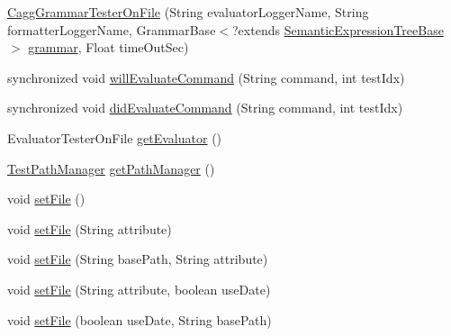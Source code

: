 \begin{DoxyCompactItemize}
\item 
\hyperlink{classit_1_1emarolab_1_1cagg_1_1interfaces_1_1CaggGrammarTesterOnFile_a554c2aac15bab27279c258d28c37d3ad}{Cagg\-Grammar\-Tester\-On\-File} (String evaluator\-Logger\-Name, String formatter\-Logger\-Name, Grammar\-Base$<$?extends \hyperlink{interfaceit_1_1emarolab_1_1cagg_1_1core_1_1evaluation_1_1semanticGrammar_1_1syntaxCompiler_1_1SemanticExpressionTreeBase}{Semantic\-Expression\-Tree\-Base} $>$ \hyperlink{classit_1_1emarolab_1_1cagg_1_1core_1_1evaluation_1_1interfacing_1_1GrammarTesterBase_ac6601808f37ef4327e6308143f01dc6a}{grammar}, Float time\-Out\-Sec)
\item 
synchronized void \hyperlink{classit_1_1emarolab_1_1cagg_1_1interfaces_1_1CaggGrammarTesterOnFile_ac48c3883379570891ba38287384a9b6a}{will\-Evaluate\-Command} (String command, int test\-Idx)
\item 
synchronized void \hyperlink{classit_1_1emarolab_1_1cagg_1_1interfaces_1_1CaggGrammarTesterOnFile_a1a56c33d2146c0a10779a7f0995d6f06}{did\-Evaluate\-Command} (String command, int test\-Idx)
\item 
Evaluator\-Tester\-On\-File \hyperlink{classit_1_1emarolab_1_1cagg_1_1interfaces_1_1CaggGrammarTesterOnFile_a4d33ab5bc3f38f20141d86032345c22e}{get\-Evaluator} ()
\item 
\hyperlink{classit_1_1emarolab_1_1cagg_1_1interfaces_1_1CaggGrammarTesterOnFile_1_1TestPathManager}{Test\-Path\-Manager} \hyperlink{classit_1_1emarolab_1_1cagg_1_1interfaces_1_1CaggGrammarTesterOnFile_aa46a2c0c248537128c3620e89df56a32}{get\-Path\-Manager} ()
\item 
void \hyperlink{classit_1_1emarolab_1_1cagg_1_1interfaces_1_1CaggGrammarTesterOnFile_a48968e288f01619e057e7a59b4b3be25}{set\-File} ()
\item 
void \hyperlink{classit_1_1emarolab_1_1cagg_1_1interfaces_1_1CaggGrammarTesterOnFile_a6b581d5f11fe97d05639cf0686326e8d}{set\-File} (String attribute)
\item 
void \hyperlink{classit_1_1emarolab_1_1cagg_1_1interfaces_1_1CaggGrammarTesterOnFile_a2802b91e55a309241ace247dc63742ff}{set\-File} (String base\-Path, String attribute)
\item 
void \hyperlink{classit_1_1emarolab_1_1cagg_1_1interfaces_1_1CaggGrammarTesterOnFile_a08aa2c70c90de3f9036e9337b13bb3ad}{set\-File} (String attribute, boolean use\-Date)
\item 
void \hyperlink{classit_1_1emarolab_1_1cagg_1_1interfaces_1_1CaggGrammarTesterOnFile_a1023e43ddfdc816dc35680a2cf8a881a}{set\-File} (boolean use\-Date, String base\-Path)

\end{DoxyCompactItemize}
